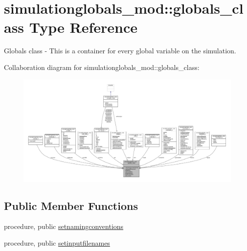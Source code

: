\hypertarget{structsimulationglobals__mod_1_1globals__class}{}\section{simulationglobals\+\_\+mod\+:\+:globals\+\_\+class Type Reference}
\label{structsimulationglobals__mod_1_1globals__class}


Globals class -\/ This is a container for every global variable on the simulation.  




Collaboration diagram for simulationglobals\+\_\+mod\+:\+:globals\+\_\+class\+:\nopagebreak
\begin{figure}[H]
\begin{center}
\leavevmode
\includegraphics[width=350pt]{structsimulationglobals__mod_1_1globals__class__coll__graph}
\end{center}
\end{figure}
\subsection*{Public Member Functions}
\begin{DoxyCompactItemize}
\item 
procedure, public \mbox{\hyperlink{structsimulationglobals__mod_1_1globals__class_a3b33541d0f9a90c78d500b55ef452ee0}{setnamingconventions}}
\item 
procedure, public \mbox{\hyperlink{structsimulationglobals__mod_1_1globals__class_af3060e8a9597abde06dd5362625f5f4e}{setinputfilenames}}
\end{DoxyCompactItemize}

